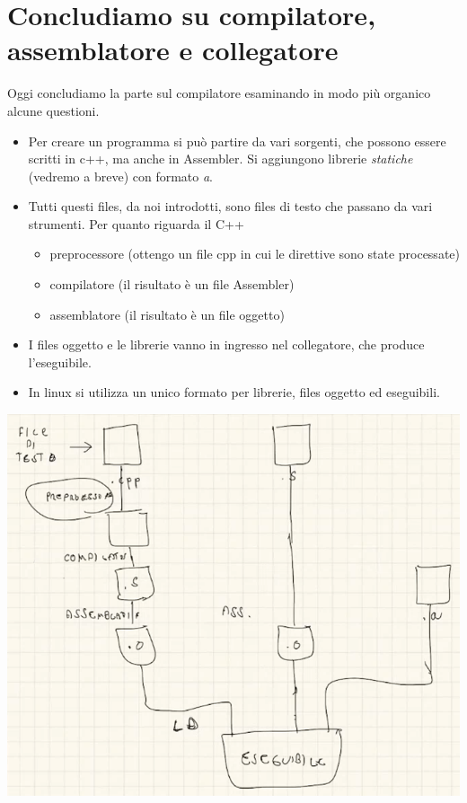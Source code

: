 \documentclass[11pt]{report}
\theoremstyle{definition}
\begin{document}
\section{Concludiamo su compilatore, assemblatore e collegatore} 
Oggi concludiamo la parte sul compilatore esaminando in modo più organico alcune questioni.
\begin{itemize}
\item Per creare un programma si può partire da vari sorgenti, che possono essere scritti in c++, ma anche in Assembler. Si aggiungono librerie \emph{statiche} (vedremo a breve) con formato \emph{a}. 
\item Tutti questi files, da noi introdotti, sono files di testo che passano da vari strumenti. Per quanto riguarda il C++
\begin{itemize}
\item preprocessore (ottengo un file cpp in cui le direttive sono state processate)
\item compilatore (il risultato è un file Assembler)
\item assemblatore (il risultato è un file oggetto)
\end{itemize}
\item I files oggetto e le librerie vanno in ingresso nel collegatore, che produce l'eseguibile.
\item In linux si utilizza un unico formato per librerie, files oggetto ed eseguibili.
\end{itemize}\begin{center}
\includegraphics[scale=0.62]{img/50.PNG}
\end{center}  
\end{document}
